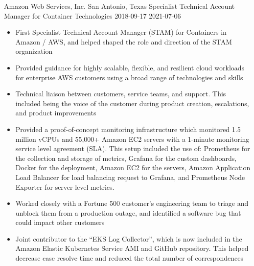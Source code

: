 \roleheader
    {Amazon Web Services, Inc.}
    {San Antonio, Texas}
    {Specialist Technical Account Manager for Container Technologies}
    {2018-09-17}
    {2021-07-06}
\begin{itemize}

    \item First Specialist Technical Account Manager (STAM) for Containers in Amazon / AWS, and helped shaped the role and direction of the STAM organization

    \item Provided guidance for highly scalable, flexible, and resilient cloud workloads for enterprise AWS customers using a broad range of technologies and skills

    \item Technical liaison between customers, service teams, and support. This included being the voice of the customer during product creation, escalations, and product improvements

    \item Provided a proof-of-concept monitoring infrastructure which monitored 1.5 million vCPUs and 55,000+ Amazon EC2 servers with a 1-minute monitoring service level agreement (SLA). This setup included the use of: Prometheus for the collection and storage of metrics, Grafana for the custom dashboards, Docker for the deployment, Amazon EC2 for the servers, Amazon Application Load Balancer for load balancing request to Grafana, and Prometheus Node Exporter for server level metrics.

    \item Worked closely with a Fortune 500 customer's engineering team to triage and unblock them from a production outage, and identified a software bug that could impact other customers

    \item Joint contributor to the ``EKS Log Collector'', which is now included in the Amazon Elastic Kubernetes Service AMI and GitHub repository. This helped decrease case resolve time and reduced the total number of correspondences

\end{itemize}
